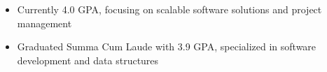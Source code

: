 \par\bigskip
{}
\begin{itemize}
  \item Currently 4.0 GPA, focusing on scalable software solutions and project management
\end{itemize}
\divider

\begin{itemize}
  \item Graduated Summa Cum Laude with 3.9 GPA, specialized in software development and data structures
\end{itemize}


